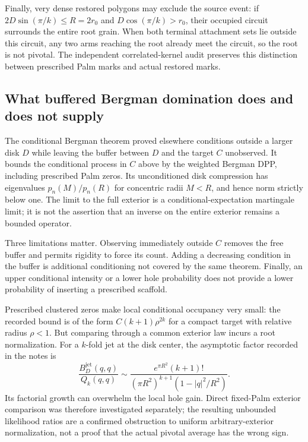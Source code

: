 \documentclass[11pt,a4paper]{article}
\theoremstyle{definition}
\theoremstyle{remark}
\numberwithin{equation}{section}
\begin{document}
Finally, very dense restored polygons may exclude the source event:
if $2D\sin(\pi/k)\le R=2r_0$ and $D\cos(\pi/k)>r_0$,
their occupied circuit surrounds the entire root grain. When both
terminal attachment sets lie outside this circuit, any two arms
reaching the root already meet the circuit, so the root is not
pivotal. The independent correlated-kernel audit preserves this
distinction between prescribed Palm marks and actual restored marks.

\subsection{What buffered Bergman domination does and does not supply}
\label{br:bergman-scope}

The conditional Bergman theorem proved elsewhere conditions outside a
larger disk $D$ while leaving the buffer between $D$ and the target $C$
unobserved.  It bounds the conditional process in $C$ above by the
weighted Bergman DPP, including prescribed Palm zeros.  Its unconditioned
disk compression has eigenvalues
$p_n(M)/p_n(R)$ for concentric radii $M<R$, and hence norm strictly
below one.  The limit to the full exterior is a conditional-expectation
martingale limit; it is not the assertion that an inverse on the
entire exterior remains a bounded operator.

Three limitations matter.  Observing immediately outside $C$ removes
the free buffer and permits rigidity to force its count.  Adding a
decreasing condition in the buffer is additional conditioning not
covered by the same theorem.  Finally, an upper conditional intensity
or a lower hole probability does not provide a lower probability of
inserting a prescribed scaffold.

Prescribed clustered zeros make local conditional occupancy very small:
the recorded bound is of the form $C(k+1)\rho^{2k}$ for a compact target
with relative radius $\rho<1$.  But comparing through a common exterior
law incurs a root normalization.  For a $k$-fold jet at the disk center,
the asymptotic factor recorded in the notes is
\[
 \frac{B_D^{\mathrm{jet}}(q,q)}{Q_k(q,q)}
 \sim
 \frac{e^{\pi R^2}(k+1)!}
      {(\pi R^2)^{k+1}(1-|q|^2/R^2)}.
\]
Its factorial growth can overwhelm the local hole gain.  Direct
fixed-Palm exterior comparison was therefore investigated separately;
the resulting unbounded likelihood ratios are a confirmed obstruction
to uniform arbitrary-exterior normalization, not a proof that the
actual pivotal average has the wrong sign.
\end{document}
